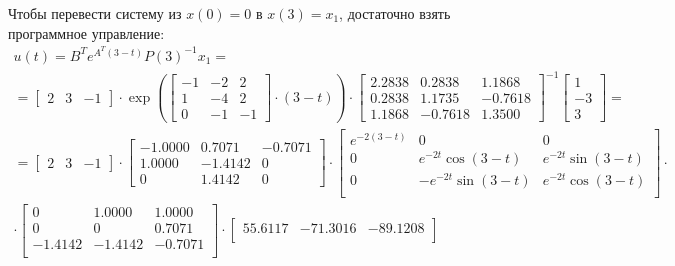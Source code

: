 Чтобы перевести систему из $x(0)=0$ в $x(3)=x_1$, достаточно взять программное управление:
\begin{multline*}
    u(t) = B^T e^{A^T(3 - t)} P(3)^{-1} x_1 = \\ =
    \begin{bmatrix}
        2 & 3 & -1
    \end{bmatrix}\cdot
    \exp\left( \begin{bmatrix}
        -1 & -2 & 2 \\ 
         1 & -4 & 2 \\ 
         0 & -1 & -1
    \end{bmatrix}\cdot(3 - t) \right)\cdot
    \begin{bmatrix}
        2.2838  &  0.2838  &  1.1868 \\
        0.2838   & 1.1735  & -0.7618 \\
        1.1868  & -0.7618  &  1.3500
    \end{bmatrix}^{-1}
    \begin{bmatrix}
        1 \\ -3 \\ 3
    \end{bmatrix}=\\
    =\begin{bmatrix}
        2 & 3 & -1
    \end{bmatrix}\cdot
    \begin{bmatrix}
        -1.0000&    0.7071 &  -0.7071\\
        1.0000  & -1.4142 &        0\\
             0   & 1.4142&         0
    \end{bmatrix}\cdot
    \begin{bmatrix}
        e^{-2(3-t)}&     0 &    0\\
        0  &  e^{-2t}\cos(3-t) &   e^{-2t}\sin(3-t)  \\
        0   &  -e^{-2t}\sin(3-t)&    e^{-2t}\cos(3-t) \\
    \end{bmatrix}\cdot\\
    \cdot\begin{bmatrix}
        0&    1.0000  &  1.0000\\
        0 &        0 &   0.7071\\
  -1.4142  & -1.4142&   -0.7071\\
    \end{bmatrix}\cdot
    \begin{bmatrix}
        55.6117&  -71.3016  &-89.1208\\

\end{bmatrix}
\end{multline*}
